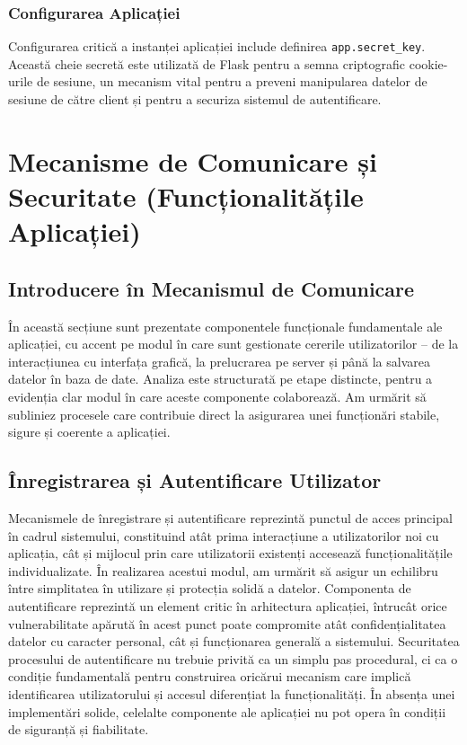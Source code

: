 \documentclass[12pt, a4paper, oneside, romanian]{teza-upb}
\begin{document}
\subsection{Configurarea Aplicației}
Configurarea critică a instanței aplicației include definirea \texttt{app.secret\_key}. Această cheie secretă este utilizată de Flask pentru a semna criptografic cookie-urile de sesiune, un mecanism vital pentru a preveni manipularea datelor de sesiune de către client și pentru a securiza sistemul de autentificare.

\chapter {Mecanisme de Comunicare și Securitate (Funcționalitățile Aplicației)}
\section{Introducere în Mecanismul de Comunicare}
În această secțiune sunt prezentate componentele funcționale fundamentale ale aplicației, cu accent pe modul în care sunt gestionate cererile utilizatorilor – de la interacțiunea cu interfața grafică, la prelucrarea pe server și până la salvarea datelor în baza de date. Analiza este structurată pe etape distincte, pentru a evidenția clar modul în care aceste componente colaborează. Am urmărit să subliniez procesele care contribuie direct la asigurarea unei funcționări stabile, sigure și coerente a aplicației.

\section{Înregistrarea și Autentificare Utilizator}
Mecanismele de înregistrare și autentificare reprezintă punctul de acces principal în cadrul sistemului, constituind atât prima interacțiune a utilizatorilor noi cu aplicația, cât și mijlocul prin care utilizatorii existenți accesează funcționalitățile individualizate. În realizarea acestui modul, am urmărit să asigur un echilibru între simplitatea în utilizare și protecția solidă a datelor. Componenta de autentificare reprezintă un element critic în arhitectura aplicației, întrucât orice vulnerabilitate apărută în acest punct poate compromite atât confidențialitatea datelor cu caracter personal, cât și funcționarea generală a sistemului. Securitatea procesului de autentificare nu trebuie privită ca un simplu pas procedural, ci ca o condiție fundamentală pentru construirea oricărui mecanism care implică identificarea utilizatorului și accesul diferențiat la funcționalități. În absența unei implementări solide, celelalte componente ale aplicației nu pot opera în condiții de siguranță și fiabilitate.
\end{document}
